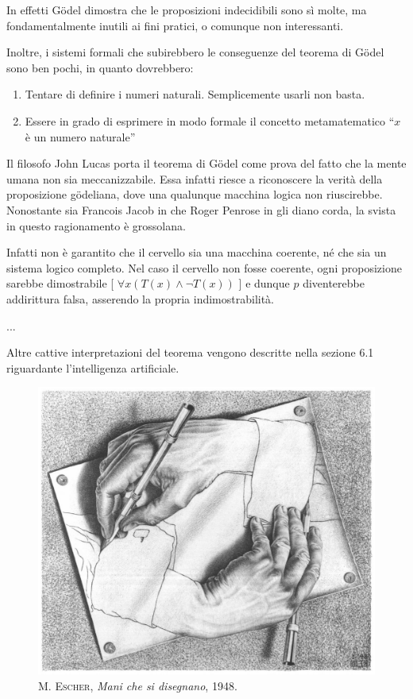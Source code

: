 \documentclass[a4paper,10pt]{article}
\begin{document}
In effetti Gödel dimostra che le proposizioni indecidibili sono sì molte, ma fondamentalmente inutili ai fini pratici, o comunque non interessanti.

Inoltre, i sistemi formali che subirebbero le conseguenze del teorema di Gödel sono ben pochi, in quanto dovrebbero: \cite{wp-teo-godel-it}
\begin{enumerate}
 \item Tentare di definire i numeri naturali. Semplicemente usarli non basta.
 \item Essere in grado di esprimere in modo formale il concetto metamatematico \textquotedblleft$x$ è un numero naturale\textquotedblright
\end{enumerate}

Il filosofo John Lucas porta il teorema di Gödel come prova del fatto che la mente umana non sia meccanizzabile. Essa infatti riesce a riconoscere la verità della proposizione gödeliana, dove una qualunque macchina logica non riuscirebbe. Nonostante sia Francois Jacob in \cite{jacob71} che Roger Penrose in \cite{penrose91} gli diano corda, la svista in questo ragionamento è grossolana.

Infatti non è garantito che il cervello sia una macchina coerente, né che sia un sistema logico completo. Nel caso il cervello non fosse coerente, ogni proposizione sarebbe dimostrabile [ $\forall x (T(x)\wedge\neg T(x))$ ] e dunque $p$ diventerebbe addirittura falsa, asserendo la propria indimostrabilità.

...

Altre cattive interpretazioni del teorema vengono descritte nella sezione 6.1 riguardante l'intelligenza artificiale.

\begin{figure}[t!]
 \centering
 \includegraphics[width=\textwidth]{./pics/drawing_hands.jpg}
 \caption{\textsc{M. Escher}, \textit{Mani che si disegnano}, 1948.}
\end{figure}
\end{document}
